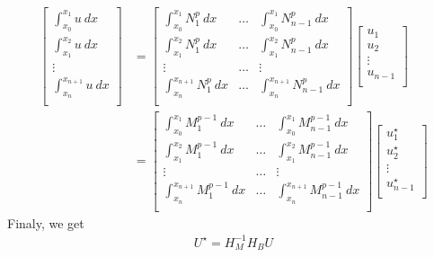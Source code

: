 \begin{align*}
  \begin{bmatrix}
    \int_{x_0}^{x_{1}}u ~dx\\
    \int_{x_1}^{x_{2}}u ~dx\\
    \vdots    \\ 
    \int_{x_n}^{x_{n+1}}u ~dx\\
  \end{bmatrix}
  &=
  \begin{bmatrix}
    \int_{x_0}^{x_{1}}N_1^p ~dx   & \ldots & \int_{x_0}^{x_{1}}N_{n-1}^p ~dx   \\
    \int_{x_1}^{x_{2}}N_1^p ~dx   & \ldots & \int_{x_1}^{x_{2}}N_{n-1}^p ~dx   \\
    \vdots                        & \ldots &                        \vdots \\
    \int_{x_n}^{x_{n+1}}N_1^p ~dx & \ldots & \int_{x_n}^{x_{n+1}}N_{n-1}^p ~dx \\
  \end{bmatrix}
  \begin{bmatrix}
    u_1\\
    u_2\\
    \vdots\\ 
    u_{n-1}\\
  \end{bmatrix}
  \\
  &= 
  \begin{bmatrix}
    \int_{x_0}^{x_{1}}M_1^{p-1} ~dx   & \ldots & \int_{x_0}^{x_{1}}M_{n-1}^{p-1} ~dx   \\
    \int_{x_1}^{x_{2}}M_1^{p-1} ~dx   & \ldots & \int_{x_1}^{x_{2}}M_{n-1}^{p-1} ~dx   \\
    \vdots                        & \ldots &                        \vdots \\
    \int_{x_n}^{x_{n+1}}M_1^{p-1} ~dx & \ldots & \int_{x_n}^{x_{n+1}}M_{n-1}^{p-1} ~dx \\
  \end{bmatrix}
  \begin{bmatrix}
    u_1^\star\\
    u_2^\star\\
    \vdots\\ 
    u_{n-1}^\star\\
  \end{bmatrix}
\end{align*}
Finaly, we get
\begin{align}
  U^\star = H_{M}^{-1} H_{B} U  
\end{align}
